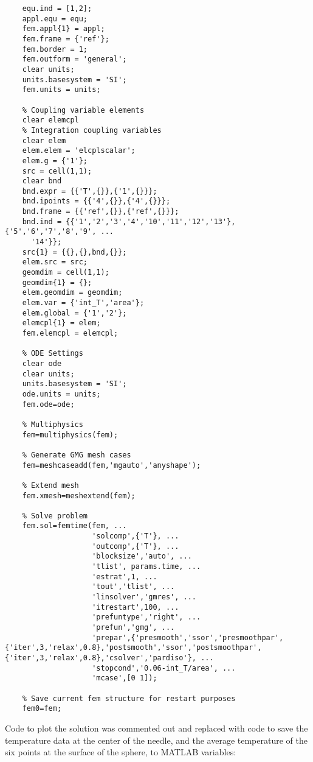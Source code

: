 \small
\begin{verbatim}
    equ.ind = [1,2];
    appl.equ = equ;
    fem.appl{1} = appl;
    fem.frame = {'ref'};
    fem.border = 1;
    fem.outform = 'general';
    clear units;
    units.basesystem = 'SI';
    fem.units = units;

    % Coupling variable elements
    clear elemcpl
    % Integration coupling variables
    clear elem
    elem.elem = 'elcplscalar';
    elem.g = {'1'};
    src = cell(1,1);
    clear bnd
    bnd.expr = {{'T',{}},{'1',{}}};
    bnd.ipoints = {{'4',{}},{'4',{}}};
    bnd.frame = {{'ref',{}},{'ref',{}}};
    bnd.ind = {{'1','2','3','4','10','11','12','13'},{'5','6','7','8','9', ...
      '14'}};
    src{1} = {{},{},bnd,{}};
    elem.src = src;
    geomdim = cell(1,1);
    geomdim{1} = {};
    elem.geomdim = geomdim;
    elem.var = {'int_T','area'};
    elem.global = {'1','2'};
    elemcpl{1} = elem;
    fem.elemcpl = elemcpl;

    % ODE Settings
    clear ode
    clear units;
    units.basesystem = 'SI';
    ode.units = units;
    fem.ode=ode;

    % Multiphysics
    fem=multiphysics(fem);

    % Generate GMG mesh cases
    fem=meshcaseadd(fem,'mgauto','anyshape');

    % Extend mesh
    fem.xmesh=meshextend(fem);

    % Solve problem
    fem.sol=femtime(fem, ...
                    'solcomp',{'T'}, ...
                    'outcomp',{'T'}, ...
                    'blocksize','auto', ...
                    'tlist', params.time, ...
                    'estrat',1, ...
                    'tout','tlist', ...
                    'linsolver','gmres', ...
                    'itrestart',100, ...
                    'prefuntype','right', ...
                    'prefun','gmg', ...
                    'prepar',{'presmooth','ssor','presmoothpar',{'iter',3,'relax',0.8},'postsmooth','ssor','postsmoothpar',{'iter',3,'relax',0.8},'csolver','pardiso'}, ...
                    'stopcond','0.06-int_T/area', ...
                    'mcase',[0 1]);

    % Save current fem structure for restart purposes
    fem0=fem;
\end{verbatim}
\normalsize

Code to plot the solution was commented out and replaced with code to save the
temperature data at the center of the needle, and the average temperature of the
six points at the surface of the sphere, to MATLAB variables:

